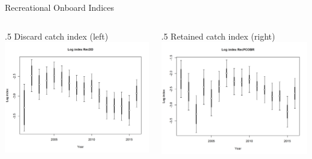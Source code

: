 \documentclass[ignorenonframetext,]{beamer}
\def\begincols{\begin{columns}}
\def\begincol{\begin{column}}
\def\endcol{\end{column}}
\def\endcols{\end{columns}}
\begin{document}
\begin{frame}{Recreational Onboard Indices}

\begincols
 \begincol{.5\textwidth} Discard catch index (left)
\includegraphics{r4ss/plots_mod1/index4_logcpuedata_RecDD.png}

\endcol
 \begincol{.5\textwidth} Retained catch index (right)
\includegraphics{r4ss/plots_mod1/index4_logcpuedata_RecPCOBR.png}
\endcol
\endcols

\end{frame}
\end{document}
